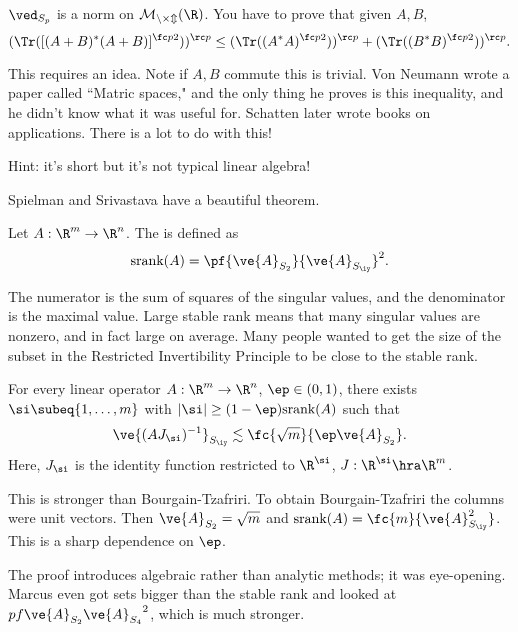 \begin{exr}
$\ved_{S_p}$ is a norm on $\cal M_{n\times m}(\R)$. You have to prove that given $A,B$,
\[
(\Tr([(A+B)^*(A+B)]^{\fc p2}))^{\rc p}
\le
(\Tr((A^*A)^{\fc p2}))^{\rc p}+(\Tr((B^*B)^{\fc p2}))^{\rc p}.
\]
\end{exr}
This requires an idea. Note if $A,B$ commute this is trivial. Von Neumann wrote a paper called ``Matric spaces," and the only thing he proves is this inequality, and he didn't know what it was useful for. Schatten later wrote books on applications. There is a lot to do with this!

Hint: it's short but it's not typical linear algebra!

Spielman and Srivastava have a beautiful theorem. %
\begin{df}
Let $A:\R^m \to \R^n$. 
The  is defined as
\[
\text{srank}(A)=\pf{\ve{A}_{S_2}}{\ve{A}_{S_\iy}}^2.
\]
\end{df}
The numerator is the sum of squares of the singular values, and the denominator is the maximal value. Large stable rank means that many singular values are nonzero, and in fact large on average. Many people wanted to get the size of the subset in the Restricted Invertibility Principle  
to be close to the stable rank.


\begin{thm}
For every linear operator $A:\R^m\to \R^n$, $\ep\in (0,1)$, 
there exists $\si\subeq \{1,\ldots, m\}$ with $|\si|\ge (1-\ep)\text{srank}(A)$ such that
\[
\ve{(AJ_\si)^{-1}}_{S_{\iy}} \lesssim \fc{\sqrt m}{\ep\ve{A}_{S_2}}.
\]
Here, $J_\si$ is the identity function restricted to $\R^{\si}$,  $J:\R^{\si}\hra \R^m$. 
\end{thm}
This is stronger than Bourgain-Tzafriri. To obtain Bourgain-Tzafriri the columns were unit vectors. Then $\ve{A}_{S_2}=\sqrt m$  and $\text{srank}(A)=\fc{m}{\ve{A}^2_{S_{\iy}}}$. 
This is a sharp dependence on $\ep$.

The proof introduces algebraic rather than analytic methods; it was eye-opening. Marcus even got sets bigger than the stable rank and looked at $pf{\ve{A}_{S_2}}{\ve{A}_{S_4}}^2$, which is much stronger.

